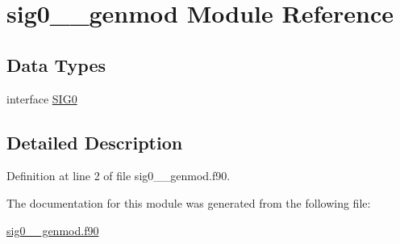 \hypertarget{classsig0____genmod}{\section{sig0\+\_\+\+\_\+genmod Module Reference}
\label{classsig0____genmod}
}
\subsection*{Data Types}
\begin{DoxyCompactItemize}
\item 
interface \hyperlink{interfacesig0____genmod_1_1SIG0}{S\+I\+G0}
\end{DoxyCompactItemize}


\subsection{Detailed Description}


Definition at line 2 of file sig0\+\_\+\+\_\+genmod.\+f90.



The documentation for this module was generated from the following file\+:\begin{DoxyCompactItemize}
\item 
\hyperlink{sig0____genmod_8f90}{sig0\+\_\+\+\_\+genmod.\+f90}\end{DoxyCompactItemize}
